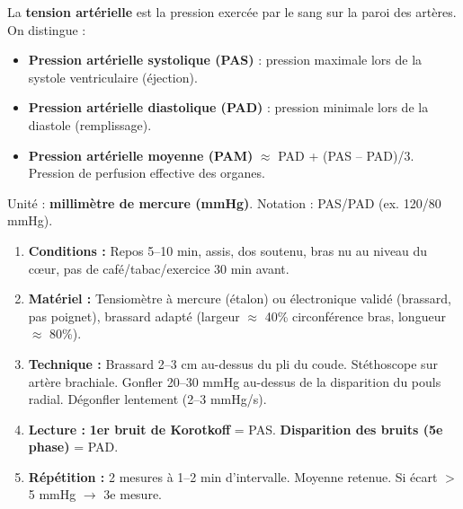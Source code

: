 \documentclass[11pt]{article}
\begin{document}
\begin{definition}
La \textbf{tension artérielle} est la pression exercée par le sang sur la paroi des artères. On distingue :
\begin{itemize}
\item \textbf{Pression artérielle systolique (PAS)} : pression maximale lors de la systole ventriculaire (éjection).
\item \textbf{Pression artérielle diastolique (PAD)} : pression minimale lors de la diastole (remplissage).
\item \textbf{Pression artérielle moyenne (PAM)} $\approx$ PAD + (PAS -- PAD)/3. Pression de perfusion effective des organes.
\end{itemize}
Unité : \textbf{millimètre de mercure (mmHg)}. Notation : PAS/PAD (ex. 120/80 mmHg).
\end{definition}

\begin{methode}
\begin{enumerate}
\item \textbf{Conditions :} Repos 5--10 min, assis, dos soutenu, bras nu au niveau du cœur, pas de café/tabac/exercice 30 min avant.
\item \textbf{Matériel :} Tensiomètre à mercure (étalon) ou électronique validé (brassard, pas poignet), brassard adapté (largeur $\approx$ 40\% circonférence bras, longueur $\approx$ 80\%).
\item \textbf{Technique :} Brassard 2--3 cm au-dessus du pli du coude. Stéthoscope sur artère brachiale. Gonfler 20--30 mmHg au-dessus de la disparition du pouls radial. Dégonfler lentement (2--3 mmHg/s).
\item \textbf{Lecture :} \textbf{1er bruit de Korotkoff} = PAS. \textbf{Disparition des bruits (5e phase)} = PAD.
\item \textbf{Répétition :} 2 mesures à 1--2 min d'intervalle. Moyenne retenue. Si écart $>$ 5 mmHg $\rightarrow$ 3e mesure.
\end{enumerate}
\end{methode}
\end{document}
